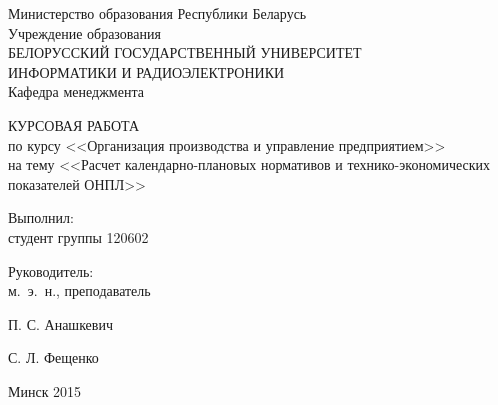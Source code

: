\begin{titlepage}
\thispagestyle{empty}
\setlength{\parindent}{0mm} %

\begin{center}
  Министерство образования Республики Беларусь \\
  \bigskip
  Учреждение образования \\
  БЕЛОРУССКИЙ ГОСУДАРСТВЕННЫЙ УНИВЕРСИТЕТ \\
  ИНФОРМАТИКИ И РАДИОЭЛЕКТРОНИКИ \\
  \bigskip
  \bigskip
  Кафедра менеджмента
\end{center}

\vspace{50mm}

\begin{center}
  {\LARGE КУРСОВАЯ РАБОТА} \\
  по курсу <<Организация производства и управление предприятием>> \\
  на тему <<Расчет календарно-плановых нормативов и
  технико-экономических показателей ОНПЛ>>
\end{center}

\vspace{35mm}

\begin{minipage}{.65\linewidth}
    Выполнил: \\
    студент группы 120602

    \bigskip

    Руководитель: \\
    м.~э.~н., преподаватель
\end{minipage}
\hfill
\begin{minipage}{.25\linewidth}
  \vspace{8mm}
  П. С. Анашкевич

  \vspace{10mm}
  С. Л. Фещенко
\end{minipage}

\vspace{40mm}
\begin{center}
  Минск 2015
\end{center}

\setlength{\parindent}{5ex} %
\end{titlepage}